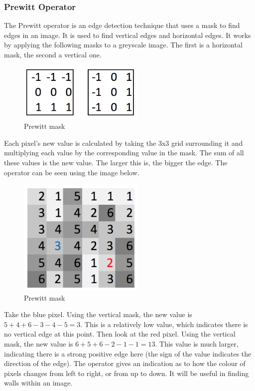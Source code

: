 \documentclass[titlepage]{article}
\begin{document}
\subsubsection{Prewitt Operator}
The Prewitt operator is an edge detection technique that uses a mask to find edges in an image. It is used to find vertical edges and horizontal edges. It works by applying the following masks to a greyscale image. The first is a horizontal mask, the second a vertical one. 

\begin{figure}[H]
  \centering
  \includegraphics[width=6cm]{prewmask.png}
  \caption{Prewitt mask}
  \label{fig:boat1}
\end{figure}

Each pixel's new value is calculated by taking the 3x3 grid surrounding it and multiplying each value by the corresponding value in the mask. The sum of all these values is the new value. The larger this is, the bigger the edge. The operator can be seen using the image below.

\begin{figure}[H]
  \centering
  \includegraphics[width=6cm]{testprew.png}
  \caption{Prewitt mask}
  \label{fig:boat1}
\end{figure}

Take the blue pixel. Using the vertical mask, the new value is $5 + 4 + 6 - 3 - 4 - 5 = 3$. This is a relatively low value, which indicates there is no vertical edge at this point. Then look at the red pixel. Using the vertical mask, the new value is $6 + 5 + 6 - 2 - 1 - 1 = 13$. This value is much larger, indicating there is a strong positive edge here (the sign of the value indicates the direction of the edge). The operator gives an indication as to how the colour of pixels changes from left to right, or from up to down. It will be useful in finding walls within an image. 
\end{document}

